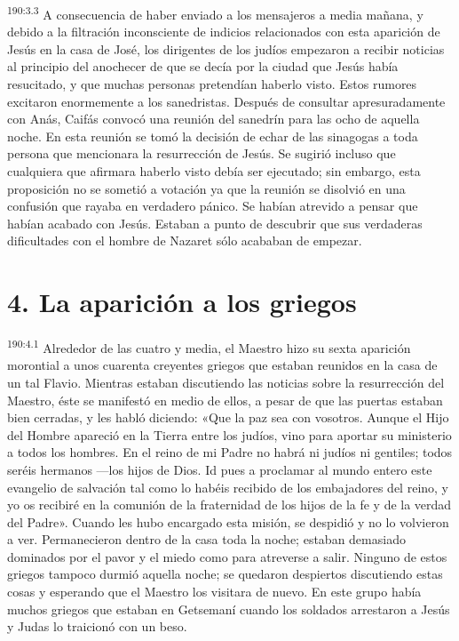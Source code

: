 \par 
\textsuperscript{190:3.3} A consecuencia de haber enviado a los mensajeros a media mañana, y debido a la filtración inconsciente de indicios relacionados con esta aparición de Jesús en la casa de José, los dirigentes de los judíos empezaron a recibir noticias al principio del anochecer de que se decía por la ciudad que Jesús había resucitado, y que muchas personas pretendían haberlo visto. Estos rumores excitaron enormemente a los sanedristas. Después de consultar apresuradamente con Anás, Caifás convocó una reunión del sanedrín para las ocho de aquella noche. En esta reunión se tomó la decisión de echar de las sinagogas a toda persona que mencionara la resurrección de Jesús. Se sugirió incluso que cualquiera que afirmara haberlo visto debía ser ejecutado; sin embargo, esta proposición no se sometió a votación ya que la reunión se disolvió en una confusión que rayaba en verdadero pánico. Se habían atrevido a pensar que habían acabado con Jesús. Estaban a punto de descubrir que sus verdaderas dificultades con el hombre de Nazaret sólo acababan de empezar.

\section*{4. La aparición a los griegos}
\par 
\textsuperscript{190:4.1} Alrededor de las cuatro y media, el Maestro hizo su sexta aparición morontial a unos cuarenta creyentes griegos que estaban reunidos en la casa de un tal Flavio. Mientras estaban discutiendo las noticias sobre la resurrección del Maestro, éste se manifestó en medio de ellos, a pesar de que las puertas estaban bien cerradas, y les habló diciendo: «Que la paz sea con vosotros. Aunque el Hijo del Hombre apareció en la Tierra entre los judíos, vino para aportar su ministerio a todos los hombres. En el reino de mi Padre no habrá ni judíos ni gentiles; todos seréis hermanos ---los hijos de Dios. Id pues a proclamar al mundo entero este evangelio de salvación tal como lo habéis recibido de los embajadores del reino, y yo os recibiré en la comunión de la fraternidad de los hijos de la fe y de la verdad del Padre». Cuando les hubo encargado esta misión, se despidió y no lo volvieron a ver. Permanecieron dentro de la casa toda la noche; estaban demasiado dominados por el pavor y el miedo como para atreverse a salir. Ninguno de estos griegos tampoco durmió aquella noche; se quedaron despiertos discutiendo estas cosas y esperando que el Maestro los visitara de nuevo. En este grupo había muchos griegos que estaban en Getsemaní cuando los soldados arrestaron a Jesús y Judas lo traicionó con un beso.

